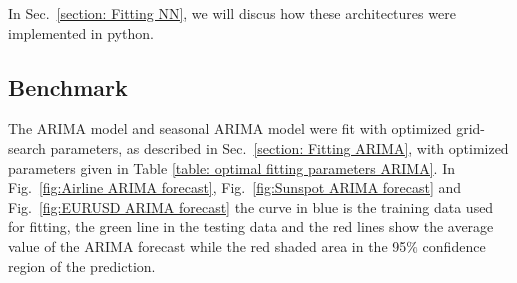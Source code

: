 \documentclass[10pt,a4paper]{article}
\begin{document}
In Sec.~\ref{section: Fitting NN}, we will discus how these architectures were implemented in python.


\newpage
\subsection{Benchmark}

%
%

The ARIMA model and seasonal ARIMA model were fit with optimized grid-search parameters, as described in Sec.~\ref{section: Fitting ARIMA}, with optimized parameters given in Table \ref{table: optimal fitting parameters ARIMA}. In Fig.~\ref{fig:Airline ARIMA forecast}, Fig.~\ref{fig:Sunspot ARIMA forecast} and Fig.~\ref{fig:EURUSD ARIMA forecast} the curve in blue is the training data used for fitting, the green line in the testing data and the red lines show the average value of the ARIMA forecast while the red shaded area in the 95$\%$ confidence region of the prediction.
\end{document}
